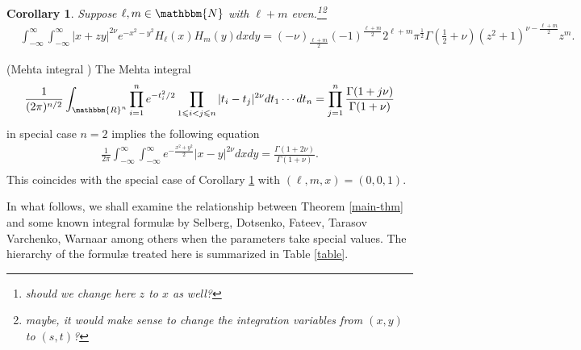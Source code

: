\documentclass[12pt]{article}
\numberwithin{equation}{section}
\newtheorem{corollary}{Corollary}[section]
{\theorembodyfont{\rmfamily}\newtheorem{example}[corollary]{Example}}
\begin{document}
\begin{corollary}
  \label{cor:Hermite}Suppose $\ell, m \in \mathbbm{N}$ with $\ell + m$
  even.\footnote{should we change here $z$ to $x$ as well?}\footnote{maybe, it would make sense to change the 
  integration variables from $(x,y)$ to $(s,t)$?}
  \begin{eqnarray}
    & \displaystyle\int_{- \infty}^{\infty} \displaystyle\int_{- \infty}^{\infty} | x + z y |^{2 \nu}
    e^{- x^2 - y^2} H_{\ell} (x) H_m (y) d x d y = (- \nu)_{\frac{\ell +
    m}{2}} (- 1)^{\frac{\ell + m}{2}} 2^{\ell + m} \pi^{\frac{1}{2}} \Gamma
    \left( \frac{1}{2} + \nu \right) (z^2 + 1)^{\nu - \frac{\ell + m}{2}} z^m
    . &  \nonumber
  \end{eqnarray}
\end{corollary}

\begin{example}
  (Mehta integral {\cite{mehta2004random}}) The Mehta integral
  \begin{equation*}
     \frac{1}{(2 \pi)^{n / 2}} \displaystyle\int_{\mathbbm{R}^n} \displaystyle\prod_{i = 1}^n e^{-
    t_i^2 / 2}_{} \displaystyle\prod_{1 \leqslant i < j \leqslant n} | t_i - t_j |^{2 \nu}
    d t_1 \cdots d t_n
     = \displaystyle\prod_{j = 1}^n \frac{\Gamma (1 + j \nu)}{\Gamma (1 + \nu)}
  \end{equation*}
  in special case $n = 2$ implies the following equation
  \begin{eqnarray}
    & \displaystyle\frac{1}{2 \pi} \displaystyle\int_{- \infty}^{\infty} \displaystyle\int_{- \infty}^{\infty} e^{-
    \frac{x^2 + y^2}{2}} | x - y |^{2 \nu} d x d y = \frac{\Gamma (1 + 2
    \nu)}{\Gamma (1 + \nu)} . &  \nonumber\\
    &  &  \nonumber
  \end{eqnarray}
  This coincides with the special case of Corollary \ref{cor:Hermite} with
  $(\ell, m, x) = (0, 0, 1)$.
\end{example}

In what follows, we shall examine the relationship between Theorem
\ref{main-thm} and some known integral formul{\ae} by Selberg, Dotsenko,
Fateev, Tarasov Varchenko, Warnaar among others when the parameters take
special values. The hierarchy of the formul{\ae} treated here is summarized in
Table \ref{table}.
\end{document}

